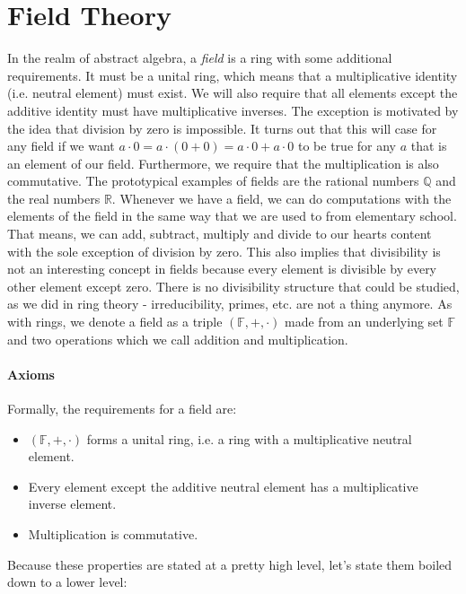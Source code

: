 \label{Sec:FieldTheory}
\section{Field Theory}
In the realm of abstract algebra, a \emph{field} is a ring with some additional requirements. It must be a unital ring, which means that a multiplicative identity (i.e. neutral element) must exist. We will also require that all elements except the additive identity must have multiplicative inverses. The exception is motivated by the idea that division by zero is impossible. It turns out that this will case for any field if we want $a \cdot 0 = a \cdot (0 + 0) = a \cdot 0 + a \cdot 0$ to be true for any $a$ that is an element of our field. Furthermore, we require that the multiplication is also commutative. The prototypical examples of fields are the rational numbers $\mathbb{Q}$ and the real numbers $\mathbb{R}$. Whenever we have a field, we can do computations with the elements of the field in the same way that we are used to from elementary school. That means, we can add, subtract, multiply and divide to our hearts content with the sole exception of division by zero. This also implies that divisibility is not an interesting concept in fields because every element is divisible by every other element except zero. There is no divisibility structure that could be studied, as we did in ring theory - irreducibility, primes, etc. are not a thing anymore. As with rings, we denote a field as a triple $(\mathbb{F}, +, \cdot)$ made from an underlying set $\mathbb{F}$ and two operations which we call addition and multiplication. 

\paragraph{Axioms}
Formally, the requirements for a field are:
\begin{itemize}
\item $(\mathbb{F},+,\cdot)$ forms a unital ring, i.e. a ring with a multiplicative neutral element.
\item Every element except the additive neutral element has a multiplicative inverse element.
\item Multiplication is commutative.
\end{itemize}
Because these properties are stated at a pretty high level, let's state them boiled down to a lower level:

